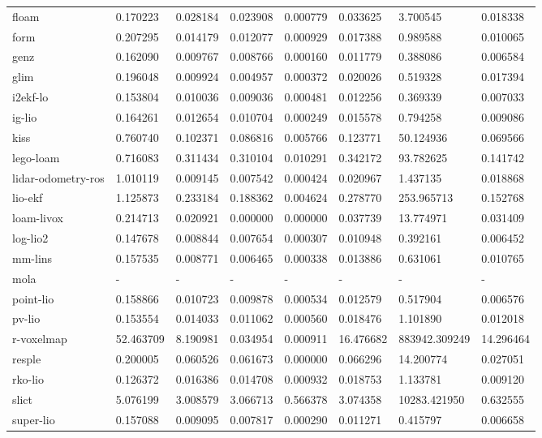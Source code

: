 \begin{table}[]
{\begin{tabular}{llllllll}
		floam & 0.170223 & 0.028184 & 0.023908 & 0.000779 & 0.033625 & 3.700545 & 0.018338 \\
		form & 0.207295 & 0.014179 & 0.012077 & 0.000929 & 0.017388 & 0.989588 & 0.010065 \\
		genz & 0.162090 & 0.009767 & 0.008766 & 0.000160 & 0.011779 & 0.388086 & 0.006584 \\
		glim & 0.196048 & 0.009924 & 0.004957 & 0.000372 & 0.020026 & 0.519328 & 0.017394 \\
		i2ekf-lo & 0.153804 & 0.010036 & 0.009036 & 0.000481 & 0.012256 & 0.369339 & 0.007033 \\
		ig-lio & 0.164261 & 0.012654 & 0.010704 & 0.000249 & 0.015578 & 0.794258 & 0.009086 \\
		kiss & 0.760740 & 0.102371 & 0.086816 & 0.005766 & 0.123771 & 50.124936 & 0.069566 \\
		lego-loam & 0.716083 & 0.311434 & 0.310104 & 0.010291 & 0.342172 & 93.782625 & 0.141742 \\
		lidar-odometry-ros & 1.010119 & 0.009145 & 0.007542 & 0.000424 & 0.020967 & 1.437135 & 0.018868 \\
		lio-ekf & 1.125873 & 0.233184 & 0.188362 & 0.004624 & 0.278770 & 253.965713 & 0.152768 \\
		loam-livox & 0.214713 & 0.020921 & 0.000000 & 0.000000 & 0.037739 & 13.774971 & 0.031409 \\
		log-lio2 & 0.147678 & 0.008844 & 0.007654 & 0.000307 & 0.010948 & 0.392161 & 0.006452 \\
		mm-lins & 0.157535 & 0.008771 & 0.006465 & 0.000338 & 0.013886 & 0.631061 & 0.010765 \\
		mola & - & - & - & - & - & - & - \\
		point-lio & 0.158866 & 0.010723 & 0.009878 & 0.000534 & 0.012579 & 0.517904 & 0.006576 \\
		pv-lio & 0.153554 & 0.014033 & 0.011062 & 0.000560 & 0.018476 & 1.101890 & 0.012018 \\
		r-voxelmap & 52.463709 & 8.190981 & 0.034954 & 0.000911 & 16.476682 & 883942.309249 & 14.296464 \\
		resple & 0.200005 & 0.060526 & 0.061673 & 0.000000 & 0.066296 & 14.200774 & 0.027051 \\
		rko-lio & 0.126372 & 0.016386 & 0.014708 & 0.000932 & 0.018753 & 1.133781 & 0.009120 \\
		slict & 5.076199 & 3.008579 & 3.066713 & 0.566378 & 3.074358 & 10283.421950 & 0.632555 \\
		super-lio & 0.157088 & 0.009095 & 0.007817 & 0.000290 & 0.011271 & 0.415797 & 0.006658 \\

\end{tabular}}
\end{table}
